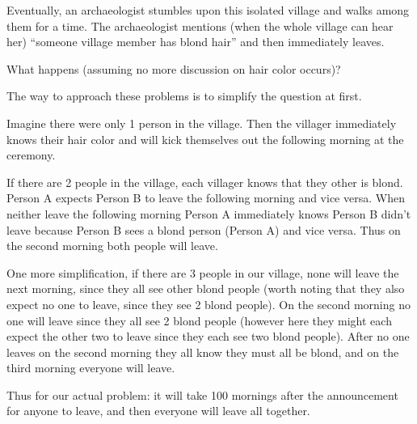 \documentclass[addpoints, answers]{exam}
\begin{document}
\begin{questions}
  Eventually, an archaeologist stumbles upon this isolated village and walks
  among them for a time. The archaeologist mentions (when the whole village can
  hear her) ``someone village member has blond hair'' and then immediately
  leaves.

  What happens (assuming no more discussion on hair color occurs)?

  \begin{solution}
    The way to approach these problems is to simplify the question at first.

    Imagine there were only 1 person in the village. Then the villager
    immediately knows their hair color and will kick themselves out the
    following morning at the ceremony.

    If there are 2 people in the village, each villager knows that they other is
    blond. Person A expects Person B to leave the following morning and vice
    versa. When neither leave the following morning Person A immediately knows
    Person B didn't leave because Person B sees a blond person (Person A) and
    vice versa. Thus on the second morning both people will leave.

    One more simplification, if there are 3 people in our village, none will
    leave the next morning, since they all see other blond people (worth noting
    that they also expect no one to leave, since they see 2 blond people). On
    the second morning no one will leave since they all see 2 blond people 
    (however here they might each expect the other two to leave since they each
    see two blond people). After no one leaves on the second morning they all
    know they must all be blond, and on the third morning everyone will leave.

    Thus for our actual problem: it will take 100 mornings after the
    announcement for anyone to leave, and then everyone will leave all together.
  \end{solution}
\end{questions}
\end{document}
